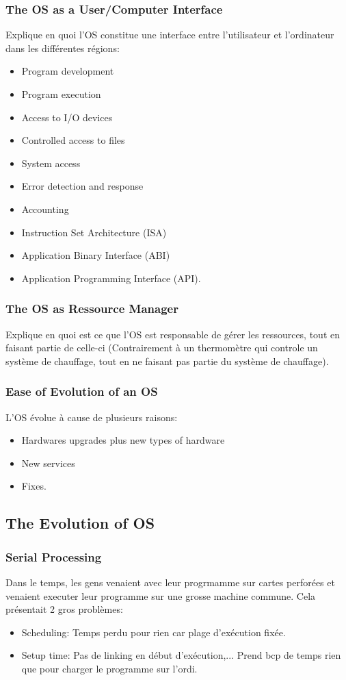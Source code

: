 \subsubsection{The OS as a User/Computer Interface}

Explique en quoi l'OS constitue une interface entre l'utilisateur et l'ordinateur dans les différentes régions:
\begin{itemize}
\item Program development
\item Program execution
\item Access to I/O devices
\item Controlled access to files
\item System access
\item Error detection and response
\item Accounting
\item Instruction Set Architecture (ISA)
\item Application Binary Interface (ABI)
\item Application Programming Interface (API).
\end{itemize}

\subsubsection{The OS as Ressource Manager}
Explique en quoi est ce que l'OS est responsable de gérer les ressources,
tout en faisant partie de celle-ci (Contrairement à un thermomètre qui controle un système de chauffage,
tout en ne faisant pas partie du système de chauffage).

\subsubsection{Ease of Evolution of an OS}
L'OS évolue à cause de plusieurs raisons:
\begin{itemize}
  \item Hardwares upgrades plus new types of hardware
  \item New services
  \item Fixes.
\end{itemize}

\subsection{The Evolution of OS}

\subsubsection{Serial Processing}
Dans le temps, les gens venaient avec leur progrmamme sur cartes perforées et venaient executer leur programme sur une grosse machine commune.
Cela présentait 2 gros problèmes:
\begin{itemize}
  \item Scheduling: Temps perdu pour rien car plage d'exécution fixée.
  \item Setup time: Pas de linking en début d'exécution,...
Prend bcp de temps rien que
    pour charger le programme sur l'ordi.
\end{itemize}

